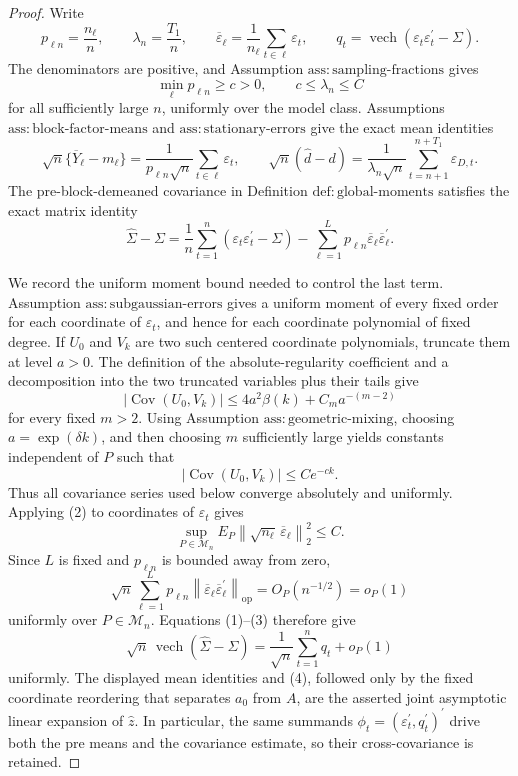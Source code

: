 \documentclass{article}
\begin{document}
\begin{proof}
Write
\[
p_{\ell n}=\frac{n_\ell}{n},\qquad
\lambda_n=\frac{T_1}{n},\qquad
\overline\varepsilon_\ell=\frac1{n_\ell}\sum_{t\in\ell}\varepsilon_t,
\qquad
q_t=\operatorname{vech}(\varepsilon_t\varepsilon_t^{\prime}-\Sigma).
\]
The denominators are positive, and Assumption \(\mathrm{ass:sampling\mbox{-}fractions}\) gives
\[
\min_\ell p_{\ell n}\geq c>0,\qquad
c\leq\lambda_n\leq C
\]
for all sufficiently large \(n\), uniformly over the model class.  Assumptions \(\mathrm{ass:block\mbox{-}factor\mbox{-}means}\) and \(\mathrm{ass:stationary\mbox{-}errors}\) give the exact mean identities
\[
\sqrt n\{\overline Y_\ell-m_\ell\}
=\frac1{p_{\ell n}\sqrt n}
\sum_{t\in\ell}\varepsilon_t,
\qquad
\sqrt n(\widehat d-d)
=\frac1{\lambda_n\sqrt n}
\sum_{t=n+1}^{n+T_1}\varepsilon_{D,t}.
\]
The pre-block-demeaned covariance in Definition \(\mathrm{def:global\mbox{-}moments}\) satisfies the exact matrix identity
\[
\widehat\Sigma-\Sigma
=\frac1n\sum_{t=1}^{n}
(\varepsilon_t\varepsilon_t^{\prime}-\Sigma)
-\sum_{\ell=1}^{L}p_{\ell n}
\overline\varepsilon_\ell\overline\varepsilon_\ell^{\prime}.
\tag{1}
\]

We record the uniform moment bound needed to control the last term.  Assumption \(\mathrm{ass:subgaussian\mbox{-}errors}\) gives a uniform moment of every fixed order for each coordinate of \(\varepsilon_t\), and hence for each coordinate polynomial of fixed degree.  If \(U_0\) and \(V_k\) are two such centered coordinate polynomials, truncate them at level \(a>0\).  The definition of the absolute-regularity coefficient and a decomposition into the two truncated variables plus their tails give
\[
|\operatorname{Cov}(U_0,V_k)|
\leq 4a^2\beta(k)
+C_m a^{-(m-2)}
\]
for every fixed \(m>2\).  Using Assumption \(\mathrm{ass:geometric\mbox{-}mixing}\), choosing \(a=\exp(\delta k)\), and then choosing \(m\) sufficiently large yields constants independent of \(P\) such that
\[
|\operatorname{Cov}(U_0,V_k)|\leq C e^{-ck}.
\tag{2}
\]
Thus all covariance series used below converge absolutely and uniformly.  Applying (2) to coordinates of \(\varepsilon_t\) gives
\[
\sup_{P\in\mathcal M_n}
E_P\left\|\sqrt{n_\ell}\,\overline\varepsilon_\ell\right\|_2^2
\leq C.
\]
Since \(L\) is fixed and \(p_{\ell n}\) is bounded away from zero,
\[
\sqrt n\sum_{\ell=1}^{L}p_{\ell n}
\left\|\overline\varepsilon_\ell
\overline\varepsilon_\ell^{\prime}\right\|_{\mathrm{op}}
=O_P(n^{-1/2})=o_P(1)
\tag{3}
\]
uniformly over \(P\in\mathcal M_n\).  Equations (1)--(3) therefore give
\[
\sqrt n\,\operatorname{vech}(\widehat\Sigma-\Sigma)
=\frac1{\sqrt n}\sum_{t=1}^{n}q_t+o_P(1)
\tag{4}
\]
uniformly.  The displayed mean identities and (4), followed only by the fixed coordinate reordering that separates \(a_0\) from \(A\), are the asserted joint asymptotic linear expansion of \(\widehat z\).  In particular, the same summands \(\phi_t=(\varepsilon_t^{\prime},q_t^{\prime})^{\prime}\) drive both the pre means and the covariance estimate, so their cross-covariance is retained.


\end{proof}
\end{document}
